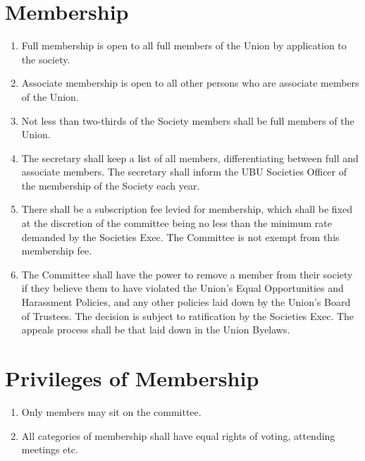 \documentclass[a4paper,10pt]{article}
\begin{document}
\section{Membership}
\begin{enumerate}
  \item Full membership is open to all full members of the Union by application to the society.
  \item Associate membership is open to all other persons who are associate members of the Union.
  \item Not less than two-thirds of the Society members shall be full members of the Union.
  \item The secretary shall keep a list of all members, differentiating between full and associate members. The secretary shall inform the UBU Societies Officer of the membership of the Society each year.
  \item There shall be a subscription fee levied for membership, which shall be fixed at the discretion of the committee being no less than the minimum rate demanded by the Societies Exec. The Committee is not exempt from this membership fee.
  \item The Committee shall have the power to remove a member from their society if they believe them to have violated the Union’s Equal Opportunities and Harassment Policies, and any other policies laid down by the Union’s Board of Trustees. The decision is subject to ratification by the Societies Exec. The appeals process shall be that laid down in the Union Byelaws.
\end{enumerate}

\section{Privileges of Membership}
\begin{enumerate}
  \item Only members may sit on the committee.
  \item All categories of membership shall have equal rights of voting, attending meetings etc.
\end{enumerate}
\end{document}
